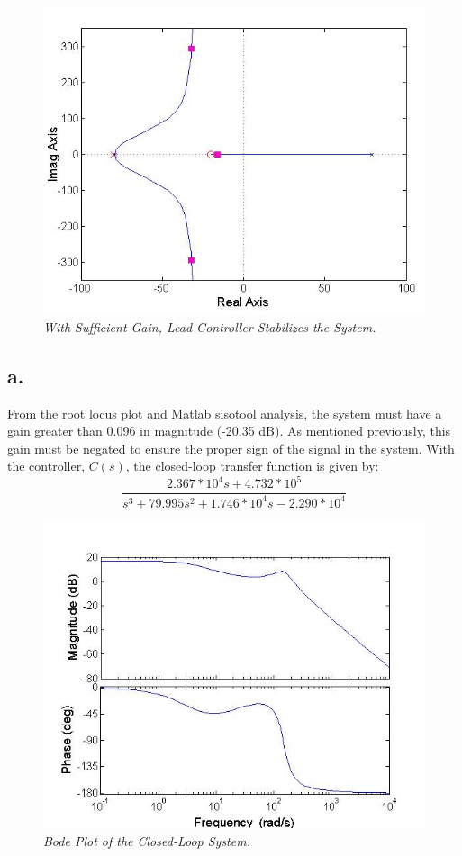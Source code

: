 \documentclass{article}
\theoremstyle{plain}
\theoremstyle{definition}
\theoremstyle{remark}
\begin{document}
\begin{figure}[h!]
\begin{center}
\includegraphics[width = 12cm]{FigureB}
\caption{\emph{With Sufficient Gain, Lead Controller Stabilizes the System.}}
\label{Q2}
\end{center}
\end{figure}

\subsection*{a.}
From the root locus plot and Matlab sisotool analysis, the system must have a gain greater than 0.096 in magnitude (-20.35 dB). As mentioned previously, this gain must be negated to ensure the proper sign of the signal in the system. With the controller, $C(s)$, the closed-loop transfer function is given by:
$$\frac{2.367*10^4 s+ 4.732*10^5}{s^3+ 79.995 s^2+1.746*10^4 s - 2.290*10^4}$$

\begin{figure}[htb]
\begin{center}
\includegraphics[width = 12cm]{ClosedLoopBode2}
\caption{\emph{Bode Plot of the Closed-Loop System.}}
\label{Q2_a}
\end{center}
\end{figure}
\end{document}
